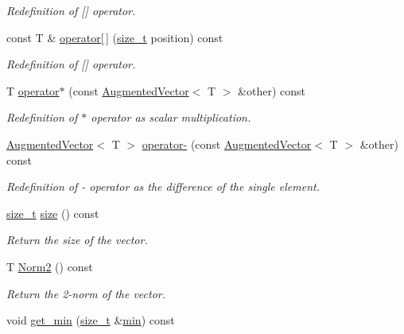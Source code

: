 \begin{DoxyCompactItemize}
\begin{DoxyCompactList}\small\item\em Redefinition of \mbox{[}\mbox{]} operator. \end{DoxyCompactList}\item 
const T \& \hyperlink{classAugmentedVector_af4e37b31234b578d627e5d6d2a25a23b}{operator\mbox{[}$\,$\mbox{]}} (\hyperlink{tutorial__fpt__2017_2intro_2sixth_2test_8c_a7c94ea6f8948649f8d181ae55911eeaf}{size\+\_\+t} position) const
\begin{DoxyCompactList}\small\item\em Redefinition of \mbox{[}\mbox{]} operator. \end{DoxyCompactList}\item 
T \hyperlink{classAugmentedVector_a6be307e136294e678924bf96991ec91c}{operator$\ast$} (const \hyperlink{classAugmentedVector}{Augmented\+Vector}$<$ T $>$ \&other) const
\begin{DoxyCompactList}\small\item\em Redefinition of $\ast$ operator as scalar multiplication. \end{DoxyCompactList}\item 
\hyperlink{classAugmentedVector}{Augmented\+Vector}$<$ T $>$ \hyperlink{classAugmentedVector_a70155aea13012d13bbef754d4b379a6d}{operator-\/} (const \hyperlink{classAugmentedVector}{Augmented\+Vector}$<$ T $>$ \&other) const
\begin{DoxyCompactList}\small\item\em Redefinition of -\/ operator as the difference of the single element. \end{DoxyCompactList}\item 
\hyperlink{tutorial__fpt__2017_2intro_2sixth_2test_8c_a7c94ea6f8948649f8d181ae55911eeaf}{size\+\_\+t} \hyperlink{classAugmentedVector_a8360b512194a0eca26dad07eb60a04d1}{size} () const
\begin{DoxyCompactList}\small\item\em Return the size of the vector. \end{DoxyCompactList}\item 
T \hyperlink{classAugmentedVector_ac8491c7dafbe2d1f020e1b260c759a7c}{Norm2} () const
\begin{DoxyCompactList}\small\item\em Return the 2-\/norm of the vector. \end{DoxyCompactList}\item 
void \hyperlink{classAugmentedVector_a1c29ec0db3858779d9b83f15c8c1d302}{get\+\_\+min} (\hyperlink{tutorial__fpt__2017_2intro_2sixth_2test_8c_a7c94ea6f8948649f8d181ae55911eeaf}{size\+\_\+t} \&\hyperlink{tutorial__pact__2019_2Introduction_2sixth_2qsort_8c_abb702d8b501669a23aa0ab3b281b9384}{min}) const

\end{DoxyCompactItemize}
